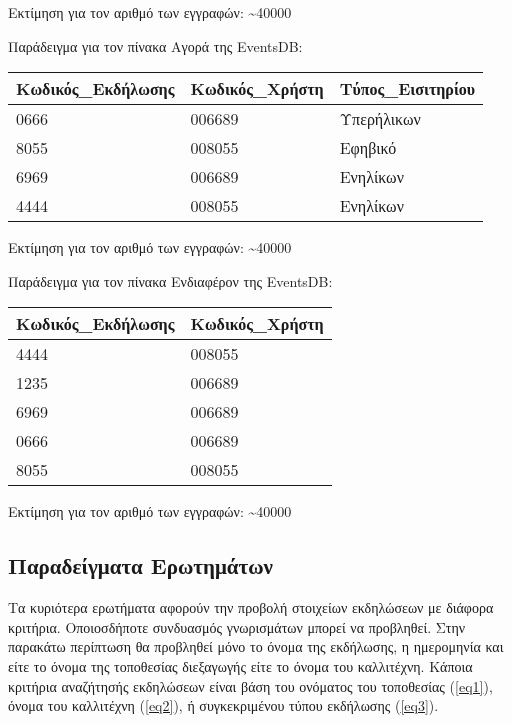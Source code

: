 Εκτίμηση για τον αριθμό των εγγραφών: \textasciitilde 40000

Παράδειγμα για τον πίνακα Αγορά της EventsDB:

\begin{table}[H]
  \centering
  \footnotesize
  \begin{tabular}{|l|l|l|}
  \hline
  Κωδικός\_Εκδήλωσης & Κωδικός\_Χρήστη & Τύπος\_Εισιτηρίου \\ \hline
  0666 & 006689 & Υπερήλικων \\ \hline
  8055 & 008055 & Εφηβικό \\ \hline
  6969 & 006689 & Ενηλίκων \\ \hline
  4444 & 008055 & Ενηλίκων \\ \hline
  
\end{tabular}
\end{table}
  
Εκτίμηση για τον αριθμό των εγγραφών: \textasciitilde 40000

Παράδειγμα για τον πίνακα Ενδιαφέρον της EventsDB:

\begin{table}[H]
  \centering
  \footnotesize
  \begin{tabular}{|l|l|}
  \hline
  Κωδικός\_Εκδήλωσης & Κωδικός\_Χρήστη \\ \hline
  4444 & 008055 \\ \hline
  1235 & 006689 \\ \hline
  6969 & 006689 \\ \hline
  0666 & 006689 \\ \hline
  8055 & 008055 \\ \hline
\end{tabular}
\end{table}
  
Εκτίμηση για τον αριθμό των εγγραφών: \textasciitilde 40000

\subsection{Παραδείγματα Ερωτημάτων}

Τα κυριότερα ερωτήματα αφορούν την προβολή στοιχείων εκδηλώσεων με
διάφορα κριτήρια. Οποιοσδήποτε συνδυασμός γνωρισμάτων μπορεί να
προβληθεί. Στην παρακάτω περίπτωση θα προβληθεί μόνο το όνομα της
εκδήλωσης, η ημερομηνία και είτε το όνομα της τοποθεσίας διεξαγωγής
είτε το όνομα του καλλιτέχνη.  Κάποια κριτήρια αναζήτησής εκδηλώσεων
είναι βάση του ονόματος του τοποθεσίας (\ref{eq1}), όνομα του
καλλιτέχνη (\ref{eq2}), ή συγκεκριμένου τύπου εκδήλωσης (\ref{eq3}).

